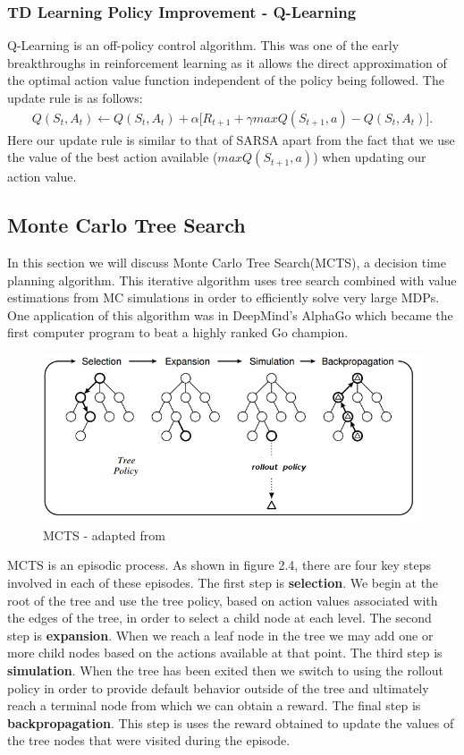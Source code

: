 \subsubsection{TD Learning Policy Improvement - Q-Learning}
Q-Learning is an off-policy control algorithm.
This was one of the early breakthroughs in reinforcement learning as it allows the direct approximation of
the optimal action value function independent of the policy being followed.
The update rule is as follows:
\begin{align}
    Q(S_t, A_t) \leftarrow Q(S_t, A_t) + \alpha \lbrack R_{t+1} + \gamma maxQ(S_{t+1}, a) - Q(S_t, A_t) \rbrack.
\end{align}
Here our update rule is similar to that of SARSA apart from the fact that we use the value of the best
action available ($maxQ(S_{t+1}, a)$) when updating our action value.

\subsection{Monte Carlo Tree Search}\label{subsec:mcts}
In this section we will discuss Monte Carlo Tree Search(MCTS), a decision time planning algorithm.
This iterative algorithm uses tree search combined with value estimations from MC simulations in order to
efficiently solve very large MDPs.
One application of this algorithm was in DeepMind's AlphaGo\citep{silver2016mastering} which became the
first computer program to beat a highly ranked Go champion.

\begin{figure}[!ht]
    \includegraphics[scale=.8]{images/MCTS.png}
    \caption{MCTS - adapted from\citep{lim2016field}}
\end{figure}

MCTS is an episodic process.
As shown in figure 2.4, there are four key steps involved in each of these episodes.
The first step is \textbf{selection}.
We begin at the root of the tree and use the tree policy, based on action values associated with the edges
of the tree, in order to select a child node at each level\citep{sutton1998reinforcement}.
The second step is \textbf{expansion}.
When we reach a leaf node in the tree we may add one or more child nodes based on
the actions available at that point.
The third step is \textbf{simulation}.
When the tree has been exited then we switch to using the rollout policy in
order to provide default behavior outside of the tree and ultimately reach a
terminal node from which we can obtain a reward.
The final step is \textbf{backpropagation}.
This step is uses the reward obtained to update the values of the tree nodes that were visited
during the episode.

